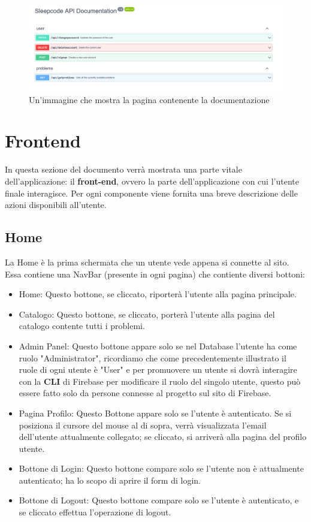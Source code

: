 \documentclass[11pt, a4paper]{article}
\theoremstyle{definition}
\begin{document}
\begin{figure}[H]
  \centering
  \includegraphics[width=\textwidth]{materiale/API/API-doc.png}
  \caption{Un'immagine che mostra la pagina contenente la documentazione}
  \label{documentazione}
\end{figure}

\newpage
\section{Frontend}
In questa sezione del documento verrà mostrata una parte vitale dell'applicazione: il \textbf{front-end}, ovvero la parte dell'applicazione con cui l'utente finale interagisce.
Per ogni componente viene fornita una breve descrizione delle azioni disponibili all'utente.

\subsection{Home}
La Home è la prima schermata che un utente vede appena si connette al sito. Essa contiene una NavBar (presente in ogni pagina) che contiente diversi bottoni:
\begin{itemize}
  \item Home: Questo bottone, se cliccato, riporterà l'utente alla pagina principale.
  \item Catalogo: Questo bottone, se cliccato, porterà l'utente alla pagina del catalogo contente tutti i problemi.
  \item Admin Panel: Questo bottone appare solo se nel Database l'utente ha come ruolo "Administrator", ricordiamo che come precedentemente illustrato il ruole di ogni utente è "User" e per promuovere un utente
  si dovrà interagire con la \textbf{CLI} di Firebase per modificare il ruolo del singolo utente, questo può essere fatto solo da persone connesse al progetto sul sito di Firebase.
  \item Pagina Profilo: Questo Bottone appare solo se l'utente è autenticato. Se si posiziona il cursore del mouse al di sopra, verrà visualizzata l'email dell'utente attualmente collegato; se cliccato, si arriverà alla pagina del profilo utente.
  \item Bottone di Login: Questo bottone compare solo se l'utente non è attualmente autenticato; ha lo scopo di aprire il form di login.
  \item Bottone di Logout: Questo bottone compare solo se l'utente è autenticato, e se cliccato effettua l'operazione di logout.
\end{itemize}
\end{document}
